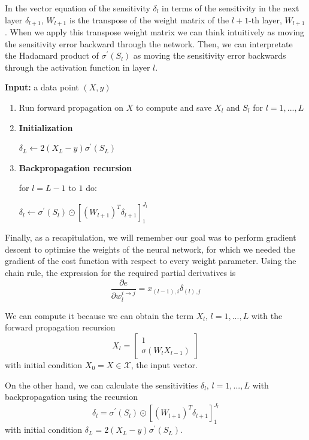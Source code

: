 In the vector equation of the sensitivity $\delta_l$ in terms of the sensitivity in the next layer $\delta_{l+1}$, $W_{l+1}$ is the transpose of the weight matrix of the $l+1$-th layer, $W_{l+1}$. When we apply this transpose weight matrix we can think intuitively as moving the sensitivity error backward through the network. Then, we can interpretate the Hadamard product of $\sigma^{\prime}(S_l)$ as moving the sensitivity error backwards through the activation function in layer $l$. 

\begin{tcolorbox}[title=Backpropagation algorithm]
    \textbf{Input:} a data point $(X,y)$
    \begin{enumerate}
        \item Run forward propagation on $X$ to compute and save $X_l$ and $S_l$ for $l=1,...,L$

        \item \textbf{Initialization} 
        
        $\delta_L \leftarrow 2(X_L - y)\sigma^{\prime}(S_L)$

        \item \textbf{Backpropagation recursion}

        for $l=L-1$ to $1$ do:
        
        \qquad $\delta_l \leftarrow \sigma^{\prime}(S_l) \odot [(W_{l+1})^T\delta_{l+1}]_{1}^{J_l}$
    \end{enumerate}
    
\end{tcolorbox}


Finally, as a recapitulation, we will remember our goal was to perform gradient descent to optimise the weights of the neural network, for which we needed the gradient of the cost function with respect to every weight parameter. Using the chain rule, the expression for the required partial derivatives is
\begin{equation}
    \frac{\partial e}{\partial w_l^{i\rightarrow j}} = x_{(l-1),i} \delta_{(l),j}
\end{equation}

We can compute it because we can obtain the term $X_l,\, l=1,...,L$ with the forward propagation recursion
\begin{equation}
    X_l = \begin{bmatrix}
        1 \\
        \sigma(W_l X_{l-1})
    \end{bmatrix} 
\end{equation}
with initial condition $X_0=X\in \mathcal{X}$, the input vector.

On the other hand, we can calculate the sensitivities $\delta_l, \, l=1,...,L$ with backpropagation using the recursion 
\begin{equation}
    \delta_l = \sigma^{\prime}(S_l) \odot [(W_{l+1})^T\delta_{l+1}]_{1}^{J_l}
\end{equation}
with initial condition $\delta_L = 2(X_L - y)\sigma^{\prime}(S_L)$.



\endinput
